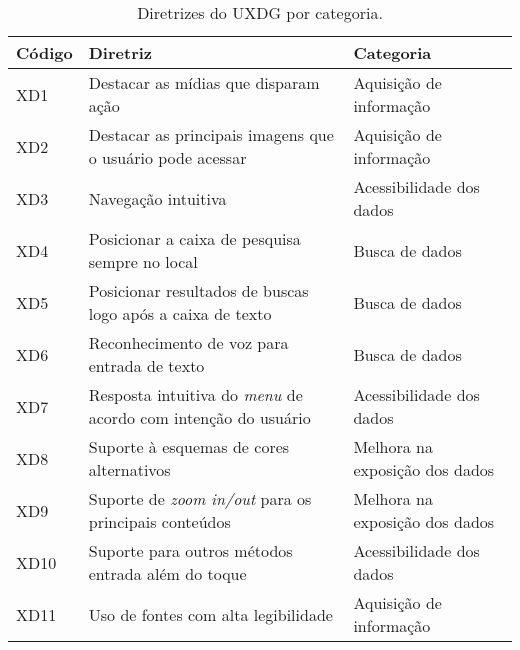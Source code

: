 \begin{table}[htb]
  \begin{center}
    \ABNTEXfontereduzida
    \caption{Diretrizes do UXDG por categoria.}
    \label{tab-acc-dir-uxd-1}
    \begin{tabular}{p{1.0cm}|p{9.0cm}|p{4.5cm}}
      \textbf{Código} & \textbf{Diretriz}                                            & \textbf{Categoria}             \\
      \hline
      XD1             & Destacar as mídias que disparam ação                         & Aquisição de informação        \\
      \hline
      XD2             & Destacar as principais imagens que o usuário pode acessar    & Aquisição de informação        \\
      \hline
      XD3             & Navegação intuitiva                                          & Acessibilidade dos dados       \\
      \hline
      XD4             & Posicionar a caixa de pesquisa sempre no local               & Busca de dados                 \\
      \hline
      XD5             & Posicionar resultados de buscas logo após a caixa de texto   & Busca de dados                 \\
      \hline
      XD6             & Reconhecimento de voz para entrada de texto                  & Busca de dados                 \\
      \hline
      XD7             & Resposta intuitiva do \emph{menu} de acordo com intenção do usuário & Acessibilidade dos dados       \\
      \hline
      XD8             & Suporte à esquemas de cores alternativos                     & Melhora na exposição dos dados \\
      \hline
      XD9             & Suporte de \emph{zoom in/out} para os principais conteúdos   & Melhora na exposição dos dados \\
      \hline
      XD10            & Suporte para outros métodos entrada além do toque            & Acessibilidade dos dados       \\
      \hline
      XD11            & Uso de fontes com alta legibilidade                          & Aquisição de informação        \\
    \end{tabular}
  \end{center}
\end{table}

